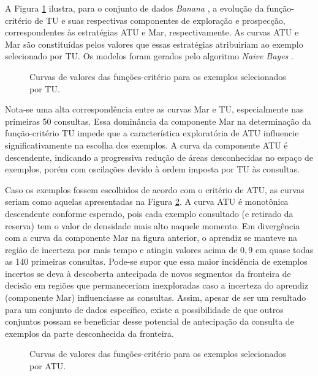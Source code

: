 A Figura \ref{domina} ilustra, para o conjunto de dados \textit{Banana} \cite{bache2013uci}, a evolução da função-critério de TU e suas respectivas componentes de exploração e prospecção, correspondentes às estratégias ATU e Mar, respectivamente.
As curvas ATU e Mar são constituídas pelos valores que essas estratégias atribuiriam ao exemplo selecionado por TU.
Os modelos foram gerados pelo algoritmo \textit{Naive Bayes} \cite{conf/ecml/Lewis98}.
\begin{figure}
	\centering
	
	\caption[Curvas das funções-critério para os exemplos selecionados por TU.]{Curvas de valores das funções-critério para os exemplos selecionados por TU.}
	\label{domina}
\end{figure}
Nota-se uma alta correspondência entre as curvas Mar e TU, especialmente nas primeiras 50 consultas.
Essa dominância da componente Mar na determinação da função-critério TU impede que a característica exploratória de ATU influencie significativamente na escolha dos exemplos.
A curva da componente ATU é descendente, indicando a progressiva redução de áreas desconhecidas no espaço de exemplos, porém com oscilações devido à ordem imposta por TU às consultas.

Caso os exemplos fossem escolhidos de acordo com o critério de ATU, as curvas seriam como aquelas apresentadas na Figura \ref{domina2}.
A curva ATU é monotônica descendente conforme esperado, pois cada exemplo consultado (e retirado da reserva) tem o valor de densidade mais alto naquele momento.
Em divergência com a curva da componente Mar na figura anterior, o aprendiz se manteve na região de incerteza por mais tempo e atingiu valores acima de $0,9$ em quase todas as 140 primeiras consultas.
Pode-se supor que essa maior incidência de exemplos incertos se deva à descoberta antecipada de novos segmentos da fronteira de decisão em regiões que permaneceriam inexploradas caso a incerteza do aprendiz (componente Mar) influenciasse as consultas.
Assim, apesar de ser um resultado para um conjunto de dados específico, existe a possibilidade de que outros conjuntos possam se beneficiar desse potencial de antecipação da consulta de exemplos da parte desconhecida da fronteira.
\begin{figure}
	\centering
	
	\caption[Curvas das funções-critério para os exemplos selecionados por ATU.]{Curvas de valores das funções-critério para os exemplos selecionados por ATU.}
	\label{domina2}
\end{figure}

